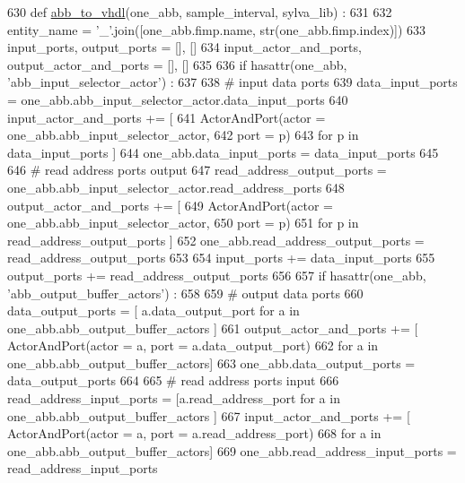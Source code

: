\begin{DoxyCode}
630 \textcolor{keyword}{def }\hyperlink{namespacesylva_1_1code__generation_1_1air_a353257c84de380833218457a45c3f2a3}{abb\_to\_vhdl}(one\_abb, sample\_interval, sylva\_lib) :
631 
632   entity\_name = \textcolor{stringliteral}{'\_'}.join([one\_abb.fimp.name, str(one\_abb.fimp.index)])
633   input\_ports, output\_ports = [], []
634   input\_actor\_and\_ports, output\_actor\_and\_ports = [], []
635 
636   \textcolor{keywordflow}{if} hasattr(one\_abb, \textcolor{stringliteral}{'abb\_input\_selector\_actor'}) :
637 
638     \textcolor{comment}{# input data ports}
639     data\_input\_ports = one\_abb.abb\_input\_selector\_actor.data\_input\_ports
640     input\_actor\_and\_ports += [
641       ActorAndPort(actor = one\_abb.abb\_input\_selector\_actor,
642         port = p)
643       \textcolor{keywordflow}{for} p \textcolor{keywordflow}{in} data\_input\_ports ]
644     one\_abb.data\_input\_ports = data\_input\_ports
645 
646     \textcolor{comment}{# read address ports output}
647     read\_address\_output\_ports = one\_abb.abb\_input\_selector\_actor.read\_address\_ports
648     output\_actor\_and\_ports += [
649       ActorAndPort(actor = one\_abb.abb\_input\_selector\_actor,
650         port = p)
651       \textcolor{keywordflow}{for} p \textcolor{keywordflow}{in} read\_address\_output\_ports ]
652     one\_abb.read\_address\_output\_ports = read\_address\_output\_ports
653 
654     input\_ports += data\_input\_ports
655     output\_ports += read\_address\_output\_ports
656 
657   \textcolor{keywordflow}{if} hasattr(one\_abb, \textcolor{stringliteral}{'abb\_output\_buffer\_actors'}) :
658 
659     \textcolor{comment}{# output data ports}
660     data\_output\_ports = [ a.data\_output\_port \textcolor{keywordflow}{for} a \textcolor{keywordflow}{in} one\_abb.abb\_output\_buffer\_actors ]
661     output\_actor\_and\_ports += [ ActorAndPort(actor = a, port = a.data\_output\_port)
662       \textcolor{keywordflow}{for} a \textcolor{keywordflow}{in} one\_abb.abb\_output\_buffer\_actors]
663     one\_abb.data\_output\_ports = data\_output\_ports
664 
665     \textcolor{comment}{# read address ports input}
666     read\_address\_input\_ports = [a.read\_address\_port \textcolor{keywordflow}{for} a \textcolor{keywordflow}{in} one\_abb.abb\_output\_buffer\_actors ]
667     input\_actor\_and\_ports += [ ActorAndPort(actor = a, port = a.read\_address\_port)
668       \textcolor{keywordflow}{for} a \textcolor{keywordflow}{in} one\_abb.abb\_output\_buffer\_actors]
669     one\_abb.read\_address\_input\_ports = read\_address\_input\_ports

\end{DoxyCode}
